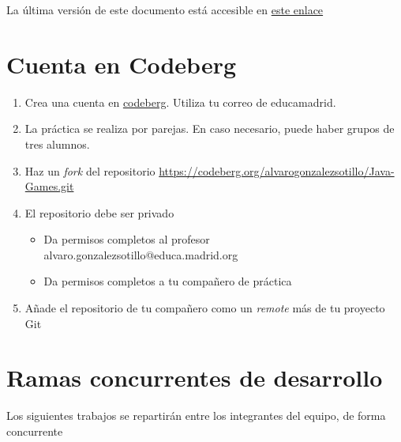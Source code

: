 \documentclass[a4paper]{article}
\begin{document}
La última versión de este documento está accesible en \href{https://alvarogonzalezsotillo.github.io/apuntes-clase/entornos-de-desarrollo/apuntes/3/ED-03-practica-git.pdf}{este enlace}
\section{Cuenta en Codeberg}
\label{sec:org0000003}
\begin{enumerate}
\item Crea una cuenta en \href{https://codeberg.org/}{codeberg}. Utiliza tu correo de educamadrid.
\item La práctica se realiza por parejas. En caso necesario, puede haber grupos de tres alumnos.
\item Haz un \emph{fork} del repositorio \url{https://codeberg.org/alvarogonzalezsotillo/Java-Games.git}
\item El repositorio debe ser privado
\begin{itemize}
\item Da permisos completos al profesor alvaro.gonzalezsotillo@educa.madrid.org
\item Da permisos completos a tu compañero de práctica
\end{itemize}
\item Añade el repositorio de tu compañero como un \emph{remote} más de tu proyecto Git
\end{enumerate}
\section{Ramas concurrentes de desarrollo}
\label{sec:org000000f}
Los siguientes trabajos se repartirán entre los integrantes del equipo, de forma concurrente
\end{document}
